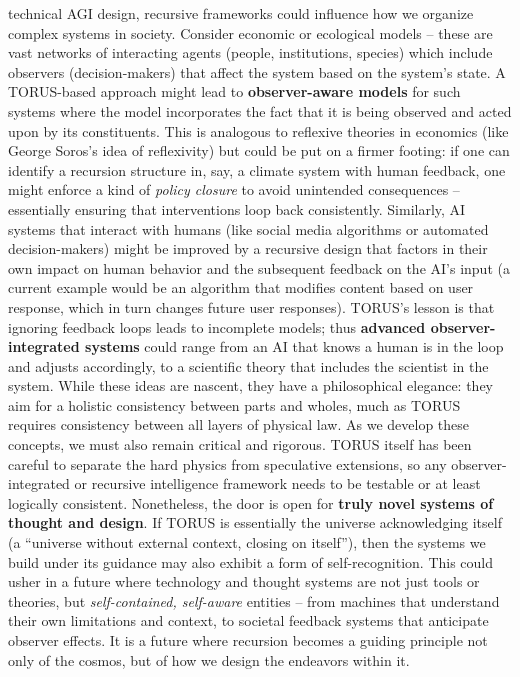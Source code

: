 \documentclass[
]{article}
\begin{document}
{\begin{itemize}
  technical AGI design, recursive frameworks could influence how we
  organize complex systems in society. Consider economic or ecological
  models -- these are vast networks of interacting agents (people,
  institutions, species) which include observers (decision-makers) that
  affect the system based on the system's state. A TORUS-based approach
  might lead to \textbf{observer-aware models} for such systems where
  the model incorporates the fact that it is being observed and acted
  upon by its constituents. This is analogous to reflexive theories in
  economics (like George Soros's idea of reflexivity) but could be put
  on a firmer footing: if one can identify a recursion structure in,
  say, a climate system with human feedback, one might enforce a kind of
  \emph{policy closure} to avoid unintended consequences -- essentially
  ensuring that interventions loop back consistently. Similarly, AI
  systems that interact with humans (like social media algorithms or
  automated decision-makers) might be improved by a recursive design
  that factors in their own impact on human behavior and the subsequent
  feedback on the AI's input (a current example would be an algorithm
  that modifies content based on user response, which in turn changes
  future user responses). TORUS's lesson is that ignoring feedback loops
  leads to incomplete models; thus \textbf{advanced observer-integrated
  systems} could range from an AI that knows a human is in the loop and
  adjusts accordingly, to a scientific theory that includes the
  scientist in the system. While these ideas are nascent, they have a
  philosophical elegance: they aim for a holistic consistency between
  parts and wholes, much as TORUS requires consistency between all
  layers of physical law\hspace{0pt}. As we develop these concepts, we
  must also remain critical and rigorous. TORUS itself has been careful
  to separate the hard physics from speculative extensions\hspace{0pt},
  so any observer-integrated or recursive intelligence framework needs
  to be testable or at least logically consistent. Nonetheless, the door
  is open for \textbf{truly novel systems of thought and design}. If
  TORUS is essentially the universe acknowledging itself (a ``universe
  without external context, closing on itself''\hspace{0pt}), then the
  systems we build under its guidance may also exhibit a form of
  self-recognition. This could usher in a future where technology and
  thought systems are not just tools or theories, but
  \emph{self-contained, self-aware} entities -- from machines that
  understand their own limitations and context, to societal feedback
  systems that anticipate observer effects. It is a future where
  recursion becomes a guiding principle not only of the cosmos, but of
  how we design the endeavors within it.
\end{itemize}

}
\end{document}
